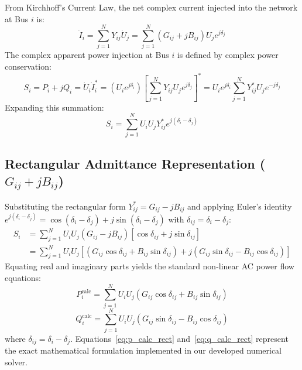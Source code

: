 \documentclass[12pt,a4paper,oneside]{report}
\begin{document}
From Kirchhoff's Current Law, the net complex current injected into the network at Bus $i$ is:
\begin{equation}
\dot{I}_i = \sum_{j=1}^N Y_{ij} \dot{U}_j = \sum_{j=1}^N (G_{ij} + jB_{ij}) U_j e^{j\delta_j}
\end{equation}
The complex apparent power injection at Bus $i$ is defined by complex power conservation:
\begin{equation}
S_i = P_i + jQ_i = \dot{U}_i \dot{I}_i^* = \left( U_i e^{j\delta_i} \right) \left[ \sum_{j=1}^N Y_{ij} U_j e^{j\delta_j} \right]^* = U_i e^{j\delta_i} \sum_{j=1}^N Y_{ij}^* U_j e^{-j\delta_j}
\end{equation}
Expanding this summation:
\begin{equation}
S_i = \sum_{j=1}^N U_i U_j Y_{ij}^* e^{j(\delta_i - \delta_j)}
\end{equation}

\subsection{Rectangular Admittance Representation ($G_{ij} + jB_{ij}$)}
Substituting the rectangular form $Y_{ij}^* = G_{ij} - jB_{ij}$ and applying Euler's identity $e^{j(\delta_i - \delta_j)} = \cos(\delta_i - \delta_j) + j\sin(\delta_i - \delta_j)$ with $\delta_{ij} = \delta_i - \delta_j$:
\begin{align}
S_i &= \sum_{j=1}^N U_i U_j (G_{ij} - jB_{ij}) [\cos\delta_{ij} + j\sin\delta_{ij}] \\
&= \sum_{j=1}^N U_i U_j \left[ (G_{ij}\cos\delta_{ij} + B_{ij}\sin\delta_{ij}) + j (G_{ij}\sin\delta_{ij} - B_{ij}\cos\delta_{ij}) \right]
\end{align}
Equating real and imaginary parts yields the standard non-linear AC power flow equations:
\begin{equation}
\label{eq:p_calc_rect}
P_i^{\text{calc}} = \sum_{j=1}^N U_i U_j (G_{ij} \cos\delta_{ij} + B_{ij} \sin\delta_{ij})
\end{equation}
\begin{equation}
\label{eq:q_calc_rect}
Q_i^{\text{calc}} = \sum_{j=1}^N U_i U_j (G_{ij} \sin\delta_{ij} - B_{ij} \cos\delta_{ij})
\end{equation}
where $\delta_{ij} = \delta_i - \delta_j$. Equations~\eqref{eq:p_calc_rect} and~\eqref{eq:q_calc_rect} represent the exact mathematical formulation implemented in our developed numerical solver.
\end{document}
